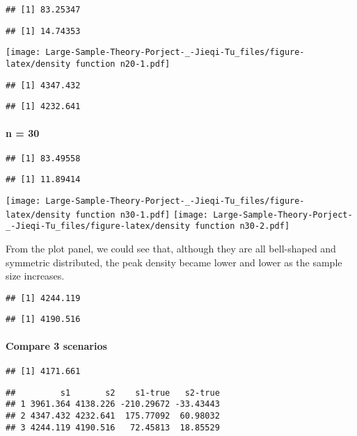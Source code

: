 \documentclass[
]{article}
\begin{document}
\begin{verbatim}
## [1] 83.25347
\end{verbatim}

\begin{verbatim}
## [1] 14.74353
\end{verbatim}

\texttt{[image: Large-Sample-Theory-Porject-\_-Jieqi-Tu\_files/figure-latex/density function n20-1.pdf]}

\begin{verbatim}
## [1] 4347.432
\end{verbatim}

\begin{verbatim}
## [1] 4232.641
\end{verbatim}

\hypertarget{n-30}{%
\paragraph{n = 30}\label{n-30}}

\begin{verbatim}
## [1] 83.49558
\end{verbatim}

\begin{verbatim}
## [1] 11.89414
\end{verbatim}

\texttt{[image: Large-Sample-Theory-Porject-\_-Jieqi-Tu\_files/figure-latex/density function n30-1.pdf]}
\texttt{[image: Large-Sample-Theory-Porject-\_-Jieqi-Tu\_files/figure-latex/density function n30-2.pdf]}

From the plot panel, we could see that, although they are all
bell-shaped and symmetric distributed, the peak density became lower and
lower as the sample size increases.

\begin{verbatim}
## [1] 4244.119
\end{verbatim}

\begin{verbatim}
## [1] 4190.516
\end{verbatim}

\hypertarget{compare-3-scenarios}{%
\paragraph{Compare 3 scenarios}\label{compare-3-scenarios}}

\begin{verbatim}
## [1] 4171.661
\end{verbatim}

\begin{verbatim}
##         s1       s2    s1-true   s2-true
## 1 3961.364 4138.226 -210.29672 -33.43443
## 2 4347.432 4232.641  175.77092  60.98032
## 3 4244.119 4190.516   72.45813  18.85529
\end{verbatim}
\end{document}
